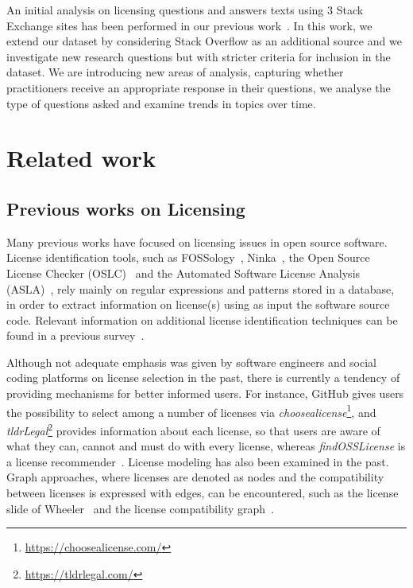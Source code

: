 \documentclass{elsarticle}
\begin{document}
An initial analysis on licensing questions and answers texts using 3 Stack Exchange sites has been performed in our previous work~\cite{kapitsaki2020developers}. In this work, we extend our dataset by considering Stack Overflow as an additional source and we investigate new research questions but with stricter criteria for inclusion in the dataset. We are introducing new areas of analysis, capturing whether practitioners receive an appropriate response in their questions, we analyse the type of questions asked and examine trends in topics over time.

\section{Related work}
\label{relatedwork}

\subsection{Previous works on Licensing}

Many previous works have focused on licensing issues in open source software. License identification tools, such as FOSSology~\cite{gobeille2008fossology}, Ninka~\cite{german2010sentence}, the Open Source License Checker (OSLC)~\cite{xu2010design} and the Automated Software License Analysis (ASLA)~\cite{tuunanen2009automated}, rely mainly on regular expressions and patterns stored in a database, in order to extract information on license(s) using as input the software source code. Relevant information on additional license identification techniques can be found in a previous survey~\cite{kapitsaki2015insight}. 

Although not adequate emphasis was given by software engineers and social coding platforms on license selection in the past, there is currently a tendency of providing mechanisms for better informed users. For instance, GitHub gives users the possibility to select among a number of licenses via \emph{choosealicense}\footnote{\url{https://choosealicense.com/}}, and \emph{tldrLegal}\footnote{\url{https://tldrlegal.com/}} provides information about each license, so that users are aware of what they can, cannot and must do with every license, whereas \emph{findOSSLicense} is a license recommender~\cite{kapitsaki2019modeling}. License modeling has also been examined in the past. Graph approaches, where licenses are denoted as nodes and the compatibility between licenses is expressed with edges, can be encountered, such as the license slide of Wheeler~\cite{wheeler2007free} and the license compatibility graph~\cite{foukarakis2012choosing}. 
\end{document}
